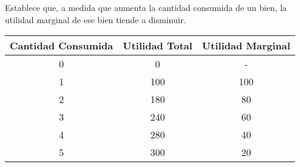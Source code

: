 Establece que,
a medida que aumenta la cantidad consumida de un bien,
la utilidad marginal de ese bien tiende a disminuir.

\begin{table}[h!]
    \centering
    \begin{tabular}{ccc}
        \hline
        Cantidad Consumida & Utilidad Total & Utilidad Marginal \\
        \hline
        0                  & 0              & -                 \\
        1                  & 100            & 100               \\
        2                  & 180            & 80                \\
        3                  & 240            & 60                \\
        4                  & 280            & 40                \\
        5                  & 300            & 20                \\
        \hline
    \end{tabular}
\end{table}